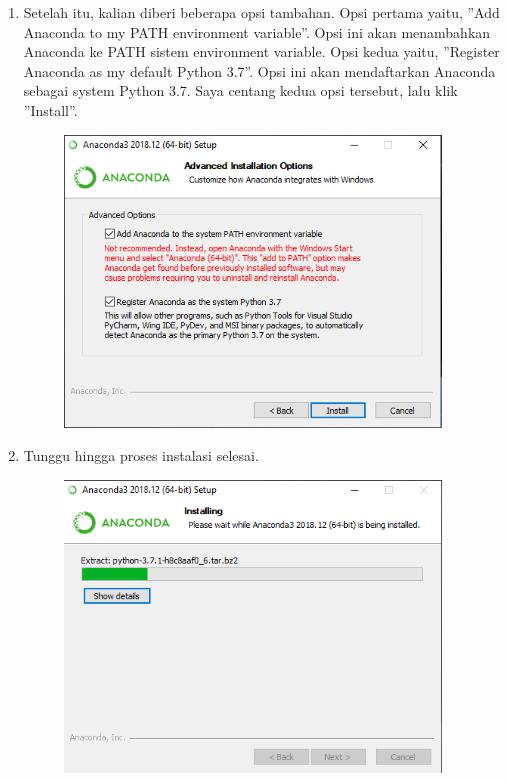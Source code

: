 \begin{enumerate}
	\item Setelah itu, kalian diberi beberapa opsi tambahan. Opsi pertama yaitu, ''Add Anaconda to my PATH environment variable''. Opsi ini akan menambahkan Anaconda ke PATH sistem environment variable. Opsi kedua yaitu, ''Register Anaconda as my default Python 3.7''. Opsi ini akan mendaftarkan Anaconda sebagai system Python 3.7. Saya centang kedua opsi tersebut, lalu klik ''Install''.
	\begin{figure}[H]
		\includegraphics[width=10cm]{figures/diva/5chp1diva.png}
		\centering
	\end{figure}

	\item Tunggu hingga proses instalasi selesai.
	\begin{figure}[H]
		\includegraphics[width=10cm]{figures/diva/6chp1diva.png}
		\centering
	\end{figure}


\end{enumerate}
